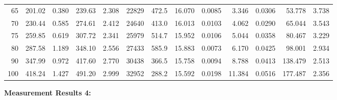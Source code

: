 \documentclass[10pt]{article}
\begin{document}
{\begin{tabular}{|r|rr|rr|rr|rr|rr|r|r|}
       65 &       201.02 &        0.380 &       239.63 &        2.308 &        22829 &        472.5 &       16.070 &       0.0085 &        3.346 &       0.0306 &       53.778 &        3.738 \\
       70 &       230.44 &        0.585 &       274.61 &        2.412 &        24640 &        413.0 &       16.013 &       0.0103 &        4.062 &       0.0290 &       65.044 &        3.543 \\
       75 &       259.85 &        0.619 &       307.72 &        2.341 &        25979 &        514.7 &       15.952 &       0.0106 &        5.044 &       0.0358 &       80.467 &        3.229 \\
       80 &       287.58 &        1.189 &       348.10 &        2.556 &        27433 &        585.9 &       15.883 &       0.0073 &        6.170 &       0.0425 &       98.001 &        2.934 \\
       90 &       347.99 &        0.972 &       417.60 &        2.770 &        30438 &        366.5 &       15.758 &       0.0094 &        8.788 &       0.0413 &      138.479 &        2.513 \\
      100 &       418.24 &        1.427 &       491.20 &        2.999 &        32952 &        288.2 &       15.592 &       0.0198 &       11.384 &       0.0516 &      177.487 &        2.356 \\
\hline
\end{tabular}
}

\vspace{3mm}

\noindent
{\large \bf Measurement Results 4:}
\vspace{3mm}
\end{document}
